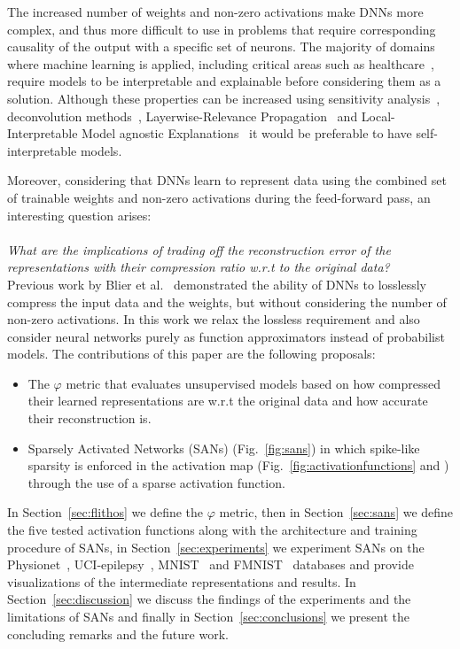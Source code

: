 \documentclass[journal]{IEEEtran}
\begin{document}
The increased number of weights and non-zero activations make DNNs more complex, and thus more difficult to use in problems that require corresponding causality of the output with a specific set of neurons.
The majority of domains where machine learning is applied, including critical areas such as healthcare~\cite{bizopoulos2019deep}, require models to be interpretable and explainable before considering them as a solution.
Although these properties can be increased using sensitivity analysis~\cite{simonyan2013deep}, deconvolution methods~\cite{zeiler2014visualizing}, Layerwise-Relevance Propagation~\cite{bach2015pixel} and Local-Interpretable Model agnostic Explanations~\cite{ribeiro2016should} it would be preferable to have self-interpretable models.

Moreover, considering that DNNs learn to represent data using the combined set of trainable weights and non-zero activations during the feed-forward pass, an interesting question arises:
\\\\
\indent\textit{What are the implications of trading off the reconstruction error of the representations with their compression ratio w.r.t to the original data?}
\\

Previous work by Blier et al.~\cite{blier2018description} demonstrated the ability of DNNs to losslessly compress the input data and the weights, but without considering the number of non-zero activations.
In this work we relax the lossless requirement and also consider neural networks purely as function approximators instead of probabilist models.
The contributions of this paper are the following proposals:
\begin{itemize}
  \item The $\varphi$ metric that evaluates unsupervised models based on how compressed their learned representations are w.r.t the original data and how accurate their reconstruction is.
  \item Sparsely Activated Networks (SANs) (Fig.~\ref{fig:sans}) in which spike-like sparsity is enforced in the activation map (Fig.~\ref{fig:activationfunctions} and ) through the use of a sparse activation function.
\end{itemize}

In Section~\ref{sec:flithos} we define the $\varphi$ metric, then in Section~\ref{sec:sans} we define the five tested activation functions along with the architecture and training procedure of SANs, in Section~\ref{sec:experiments} we experiment SANs on the Physionet~\cite{goldberger2000physiobank}, UCI-epilepsy~\cite{andrzejak2001indications}, MNIST~\cite{lecun1998gradient} and FMNIST~\cite{xiao2017fashion} databases and provide visualizations of the intermediate representations and results.
In Section~\ref{sec:discussion} we discuss the findings of the experiments and the limitations of SANs and finally in Section~\ref{sec:conclusions} we present the concluding remarks and the future work.
\end{document}
